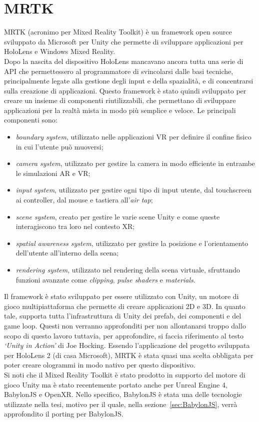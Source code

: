 \section{MRTK}\label{sec:MRTK}
MRTK (acronimo per Mixed Reality Toolkit) è un framework open source sviluppato da Microsoft per Unity che permette di sviluppare applicazioni per HoloLens e Windows Mixed Reality\cite{MRTK}.\\
Dopo la nascita del dispositivo HoloLens mancavano ancora tutta una serie di API che permettessero al programmatore di svincolarsi dalle basi tecniche, principalmente legate 
alla gestione degli input e della spazialità, e di concentrarsi sulla creazione di applicazioni.
Questo framework è stato quindi sviluppato per creare un insieme di componenti riutilizzabili, che permettano di sviluppare applicazioni per la realtà mista in modo più semplice e 
veloce. Le principali componenti sono:
\begin{itemize}
    \item \textit{boundary system}, utilizzato nelle applicazioni VR per definire il confine fisico in cui l'utente può muoversi;
    \item \textit{camera system}, utilizzato per gestire la camera in modo efficiente in entrambe le simulazioni AR e VR;
    \item \textit{input system}, utilizzato per gestire ogni tipo di input utente, dal touchscreen ai controller, dal mouse e tastiera all'\textit{air tap};
    \item \textit{scene system}, creato per gestire le varie scene Unity e come queste interagiscono tra loro nel contesto XR;
    \item \textit{spatial awareness system}, utilizzato per gestire la posizione e l'orientamento dell'utente all'interno della scena;
    \item \textit{rendering system}, utilizzato nel rendering della scena virtuale, sfruttando funzioni avanzate come \textit{clipping}, \textit{pulse shaders} e \textit{materials}.
\end{itemize}
Il framework è stato sviluppato per essere utilizzato con Unity, un motore di gioco multipiattaforma che permette di creare applicazioni 2D e 3D. In quanto tale, supporta tutta
l'infrastruttura di Unity dei prefab, dei componenti e del game loop. Questi non verranno approfonditi per non allontanarsi troppo dallo scopo di questo lavoro tuttavia, per 
approfondire, si faccia riferimento al testo \textit{`Unity in Action'} di Joe Hocking\cite{hocking2018}. Essendo 
l'applicazione del progetto sviluppata per HoloLens 2 (di casa Microsoft), MRTK è stata quasi una scelta obbligata per poter creare ologrammi in modo nativo per questo dispositivo.\\
Si noti che il Mixed Reality Toolkit è stato prodotto in supporto del motore di gioco Unity ma è stato recentemente portato anche per Unreal Engine 4, BabylonJS e OpenXR. Nello 
specifico, BabylonJS è stata una delle tecnologie utilizzate nella tesi, motivo per il quale, nella sezione~\ref{sec:BabylonJS}, verrà approfondito il porting per BabylonJS.

